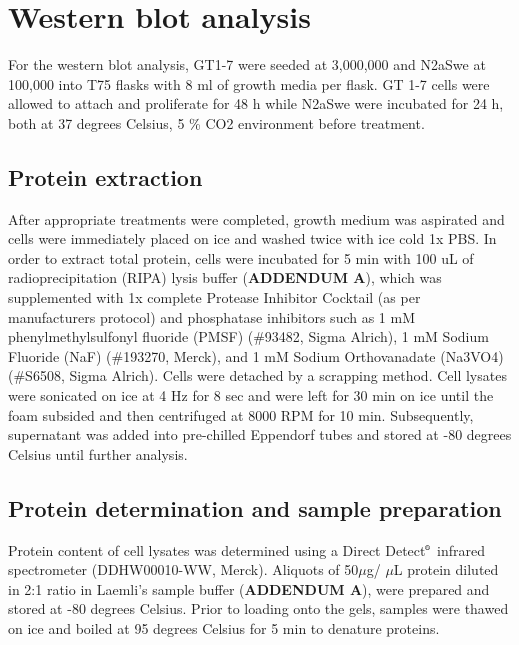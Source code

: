 \section{Western blot analysis}
For the western blot analysis, GT1-7 were seeded at 3,000,000 and N2aSwe at 100,000 into T75 flasks with 8 ml of growth media per flask. GT 1-7 cells were allowed to attach and proliferate for 48 h while N2aSwe were incubated for 24 h, both at 37 degrees Celsius, 5 \% CO2 environment before treatment.

\subsection{Protein extraction}
After appropriate treatments were completed, growth medium was aspirated and cells were immediately placed on ice and washed twice with ice cold 1x PBS. In order to extract total protein, cells were incubated for 5 min with 100 uL of radioprecipitation (RIPA) lysis buffer (\textbf{ADDENDUM A}), which was supplemented with 1x complete Protease Inhibitor Cocktail (as per manufacturers protocol) and phosphatase inhibitors such as 1 mM phenylmethylsulfonyl fluoride (PMSF) (\#93482, Sigma Alrich), 1 mM Sodium Fluoride (NaF) (\#193270, Merck), and 1 mM Sodium Orthovanadate (Na3VO4) (\#S6508, Sigma Alrich). Cells were detached by a scrapping method. Cell lysates were sonicated on ice at 4 Hz for 8 sec and were left for 30 min on ice until the foam subsided and then centrifuged at 8000 RPM for 10 min. Subsequently, supernatant was added into pre-chilled Eppendorf tubes and stored at -80 degrees Celsius until further analysis.

\subsection{Protein determination and sample preparation}
Protein content of cell lysates was determined using a Direct Detect${\textsuperscript{\tiny{\textregistered}}}$ infrared spectrometer (DDHW00010-WW, Merck). Aliquots of 50$\mu$g/ $\mu$L protein diluted in 2:1 ratio in Laemli’s sample buffer (\textbf{ADDENDUM A}), were prepared and stored at -80 degrees Celsius. Prior to loading onto the gels, samples were thawed on ice and boiled at 95 degrees Celsius for 5 min to denature proteins.

